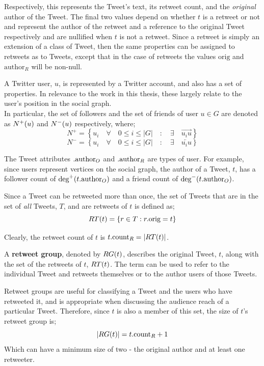 Respectively, this represents the Tweet's text, its retweet count, and the \textit{original} author of the Tweet. The final two values depend on whether $t$ is a retweet or not and represent the author of the retweet and a reference to the original Tweet respectively and are nullified when $t$ is not a retweet. Since a retweet is simply an extension of a class of Tweet, then the same properties can be assigned to retweets as to Tweets, except that in the case of retweets the values $\mathrm{orig}$ and $\mathrm{author}_R$ will be non-null.

A Twitter user, $u$, is represented by a Twitter account, and also has a set of properties. In relevance to the work in this thesis, these largely relate to the user's position in the social graph.\\
In particular, the set of followers and the set of friends of user $u \in G$ are denoted as $N^+(u)$ and $N^-(u)$ respectively, where;\\
\[
    N^+ = \left\{u_i \quad \forall \quad 0 \leq i \leq |G| \quad : \quad \exists \quad \overrightarrow{u_i u} \right\}
\]
\[
    N^- = \left\{u_i \quad \forall \quad 0 \leq i \leq |G| \quad : \quad \exists \quad \overleftarrow{u_i u} \right\}
\]

The Tweet attributes $.\textrm{author}_O$ and $.\textrm{author}_R$ are types of user. For example, since users represent vertices on the social graph, the author of a Tweet, $t$, has a follower count of $\textrm{deg}^+(t.\textrm{author}_O)$ and a friend count of $\textrm{deg}^-(t.\textrm{author}_O)$.

Since a Tweet can be retweeted more than once, the set of Tweets that are in the set of \textit{all} Tweets, $T$, and are retweets of $t$ is defined as;
\[
    RT(t) = \left\{ r \in T : r.\textrm{orig} = t \right\}
\]

Clearly, the retweet count of $t$ is $ t.\textrm{count}_R = \left\vert{RT(t)}\right\vert $.


\begin{mydefinition}
A \textbf{retweet group}, denoted by $RG(t)$, describes the original Tweet, $t$, along with the set of the retweets of $t$, $RT(t)$. The term can be used to refer to the individual Tweet and retweets themselves or to the author users of those Tweets.
\end{mydefinition}


Retweet groups are useful for classifying a Tweet and the users who have retweeted it, and is appropriate when discussing the audience reach of a particular Tweet. Therefore, since $t$ is also a member of this set, the size of $t$'s retweet group is; 
\[
	\left\vert{
RG(t)}\right\vert = t.\textrm{count}_R + 1 
\] 
Which can have a minimum size of two - the original author and at least one retweeter.
 
